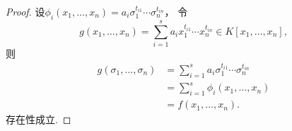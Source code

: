 \begin{theorem}[对称多项式基本定理]
\begin{proof}
设\(\phi_i(x_1,\dotsc,x_n)
=a_i \sigma_1^{t_{i1}} \dotsm \sigma_n^{t_{in}}\)，
令\[
	g(x_1,\dotsc,x_n)
	=\sum_{i=1}^s a_i x_1^{t_{i1}} \dotsm x_n^{t_{in}}
	\in K[x_1,\dotsc,x_n],
\]
则\begin{align*}
	g(\sigma_1,\dotsc,\sigma_n)
	&=\sum_{i=1}^s a_i \sigma_1^{t_{i1}} \dotsm \sigma_n^{t_{in}} \\
	&=\sum_{i=1}^s \phi_i(x_1,\dotsc,x_n) \\
	&=f(x_1,\dotsc,x_n).
\end{align*}
存在性成立.
\end{proof}
\end{theorem}
